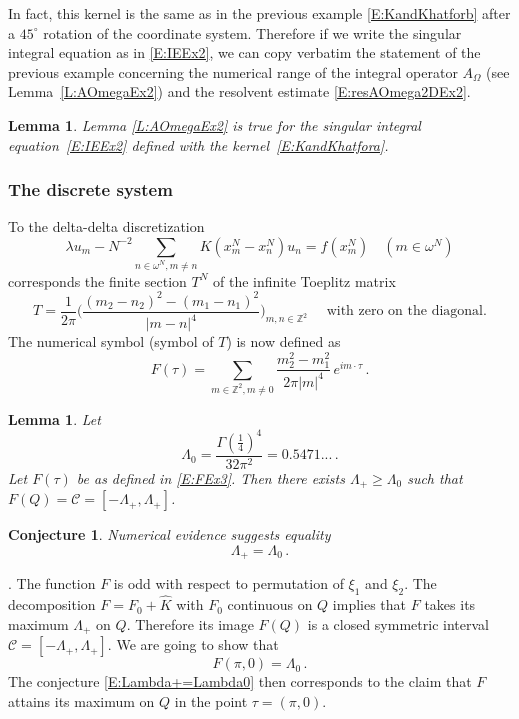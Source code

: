 \documentclass[12pt]{amsart}
\newtheorem{lemma}[theorem]{Lemma}
\newtheorem{conjecture}[theorem]{Conjecture}
\theoremstyle{definition}
\theoremstyle{remark}
\numberwithin{equation}{section}
\newcommand\Z{{\mathbb Z}}
\newcommand\cC{{\mathcal{C}}}
\let\hat=\widehat
\begin{document}
In fact, this kernel is the same as in the previous example \eqref{E:KandKhatforb} after a $45^{\circ}$ rotation of the coordinate system. 
Therefore if we write the singular integral equation as in \eqref{E:IEEx2}, we can copy verbatim the statement of the previous example concerning the numerical range of the integral operator $A_{\Omega}$ (see Lemma~\ref{L:AOmegaEx2}) and the resolvent estimate \eqref{E:resAOmega2DEx2}.
\begin{lemma}
 \label{L:AOmegaEx3}
 Lemma \ref{L:AOmegaEx2} is true for the singular integral equation~\eqref{E:IEEx2} defined with the kernel~\eqref{E:KandKhatfora}.
\end{lemma}

\subsubsection{The discrete system}\label{SS:DA2dEx3}
To the delta-delta discretization 
\begin{equation}
\label{E:DDA2dEx3}
 \lambda u_{m} - N^{-2}\sum_{n\in\omega^{N},m\ne n} K(x^{N}_{m}-x^{N}_{n}) u_{n}
   = f(x^{N}_{m}) \quad (m\in\omega^{N})
\end{equation}
corresponds the finite section $T^{N}$ of the infinite Toeplitz matrix
$$
  T = \frac1{2\pi} \Big(  
  \frac{(m_{2}-n_{2})^{2}-(m_{1}-n_{1})^{2}}{|m-n|^{4}}
  \Big)_{m,n\in\Z^{2}}\quad
  \mbox{ with zero on the diagonal.}
$$ 
The numerical symbol (symbol of $T$) is now defined as
\begin{equation}
\label{E:FEx3}
 F(\tau) = \sum_{m\in\Z^{2},m\ne0}\frac{m_{2}^{2}-m_{1}^{2}}{2\pi|m|^{4}}\,e^{im\cdot \tau}
 \,.
\end{equation}
\begin{lemma}
 \label{L:im(Fex3)}
 Let $$\Lambda_{0}=\dfrac{\Gamma(\frac14)^{4}}{32\pi^{2}}=0.5471...\,.$$ 
 Let $F(\tau)$ be as defined in \eqref{E:FEx3}. 
 Then there exists $\Lambda_{+}\ge\Lambda_{0}$ such that 
 $F(Q)=\cC=[-\Lambda_{+},\Lambda_{+}]$. 
 \end{lemma}
\begin{conjecture}
 \label{C:Lambda+=Lambda0}
 Numerical evidence suggests equality 
 \begin{equation}
\label{E:Lambda+=Lambda0}
 \Lambda_{+}=\Lambda_{0}\,.
\end{equation}
\end{conjecture}
\par{}. \ignorespaces
 The function $F$ is odd with respect to permutation of $\xi_{1}$ and $\xi_{2}$. The decomposition $F=F_{0}+\hat K$ with $F_{0}$ continuous on $Q$ implies that $F$ takes its maximum $\Lambda_{+}$ on $Q$. Therefore its image $F(Q)$ is a closed symmetric interval 
$\cC=[-\Lambda_{+},\Lambda_{+}]$. We are going to show that 
\begin{equation}
\label{E:F(pi)=Lambda0}
 F(\pi,0) = \Lambda_{0}\,.
\end{equation}
The conjecture \eqref{E:Lambda+=Lambda0} then corresponds to the claim that $F$ attains its maximum on $Q$ in the point $\tau=(\pi,0)$.
\end{document}
